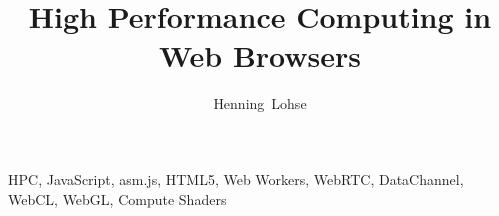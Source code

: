 \title{High Performance Computing in Web Browsers}
\author{Henning~Lohse}

%
{}

\maketitle


\begin{abstract}

\end{abstract}

\begin{IEEEkeywords}
HPC, JavaScript, asm.js, HTML5, Web Workers, WebRTC, DataChannel, WebCL, WebGL, Compute Shaders
\end{IEEEkeywords}
